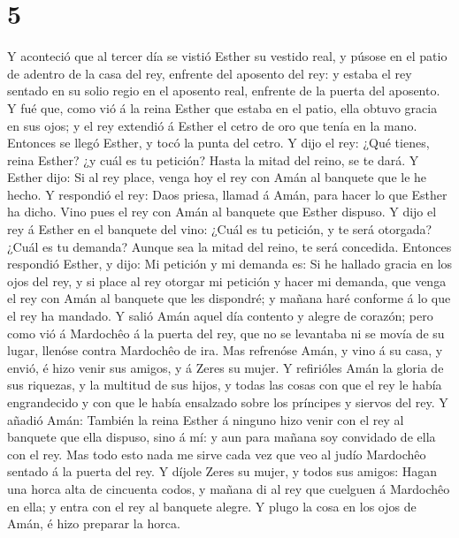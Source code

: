 \hypertarget{section-4}{%
\section{5}\label{section-4}}

 Y aconteció que al tercer día se vistió Esther su vestido
real, y púsose en el patio de adentro de la casa del rey, enfrente del
aposento del rey: y estaba el rey sentado en su solio regio en el
aposento real, enfrente de la puerta del aposento.  Y fué
que, como vió á la reina Esther que estaba en el patio, ella obtuvo
gracia en sus ojos; y el rey extendió á Esther el cetro de oro que tenía
en la mano. Entonces se llegó Esther, y tocó la punta del cetro.
 Y dijo el rey: ¿Qué tienes, reina Esther? ¿y cuál es tu
petición? Hasta la mitad del reino, se te dará.  Y Esther
dijo: Si al rey place, venga hoy el rey con Amán al banquete que le he
hecho.  Y respondió el rey: Daos priesa, llamad á Amán,
para hacer lo que Esther ha dicho. Vino pues el rey con Amán al banquete
que Esther dispuso.  Y dijo el rey á Esther en el banquete
del vino: ¿Cuál es tu petición, y te será otorgada? ¿Cuál es tu demanda?
Aunque sea la mitad del reino, te será concedida. 
Entonces respondió Esther, y dijo: Mi petición y mi demanda es:
 Si he hallado gracia en los ojos del rey, y si place al
rey otorgar mi petición y hacer mi demanda, que venga el rey con Amán al
banquete que les dispondré; y mañana haré conforme á lo que el rey ha
mandado.  Y salió Amán aquel día contento y alegre de
corazón; pero como vió á Mardochêo á la puerta del rey, que no se
levantaba ni se movía de su lugar, llenóse contra Mardochêo de ira.
 Mas refrenóse Amán, y vino á su casa, y envió, é hizo
venir sus amigos, y á Zeres su mujer.  Y refirióles Amán
la gloria de sus riquezas, y la multitud de sus hijos, y todas las cosas
con que el rey le había engrandecido y con que le había ensalzado sobre
los príncipes y siervos del rey.  Y añadió Amán: También
la reina Esther á ninguno hizo venir con el rey al banquete que ella
dispuso, sino á mí: y aun para mañana soy convidado de ella con el rey.
 Mas todo esto nada me sirve cada vez que veo al judío
Mardochêo sentado á la puerta del rey.  Y díjole Zeres su
mujer, y todos sus amigos: Hagan una horca alta de cincuenta codos, y
mañana di al rey que cuelguen á Mardochêo en ella; y entra con el rey al
banquete alegre. Y plugo la cosa en los ojos de Amán, é hizo preparar la
horca.

